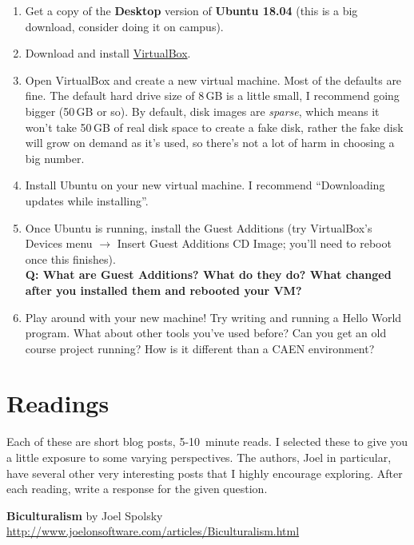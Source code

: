 \documentclass{article}
\begin{document}
\medskip

\begin{enumerate}
  \item Get a copy of the \textbf{Desktop} version of \textbf{Ubuntu 18.04}
    (this is a big download, consider doing it on campus).
  \item Download and install \href{https://www.virtualbox.org}{VirtualBox}.
  \item Open VirtualBox and create a new virtual machine. Most of the defaults
    are fine. The default hard drive size of 8\,GB is a little small, I
    recommend going bigger (50\,GB or so). By default, disk images are
    \emph{sparse}, which means it won't take 50\,GB of real disk space to
    create a fake disk, rather the fake disk will grow on demand as it's used,
    so there's not a lot of harm in choosing a big number.
  \item Install Ubuntu on your new virtual machine. I recommend ``Downloading
    updates while installing''.
  \item Once Ubuntu is running, install the Guest Additions (try VirtualBox's
    Devices menu $\rightarrow$ Insert Guest Additions CD Image; you'll need to
    reboot once this finishes).
    \\
    \textbf{Q: What are Guest Additions? What do they do? What changed after
    you installed them and rebooted your VM?}
    \vspace{3.5cm}
  \item Play around with your new machine! Try writing and running a Hello
    World program. What about other tools you've used before? Can you get an
    old course project running? How is it different than a CAEN environment?
\end{enumerate}


\newpage
\section{Readings}

Each of these are short blog posts, 5-10~minute reads. I selected these to
give you a little exposure to some varying perspectives. The authors, Joel in
particular, have several other very interesting posts that I highly encourage
exploring. After each reading, write a response for the given question.

\medskip

\noindent
\textbf{Biculturalism} by Joel Spolsky\\
\url{http://www.joelonsoftware.com/articles/Biculturalism.html}\\
\end{document}
